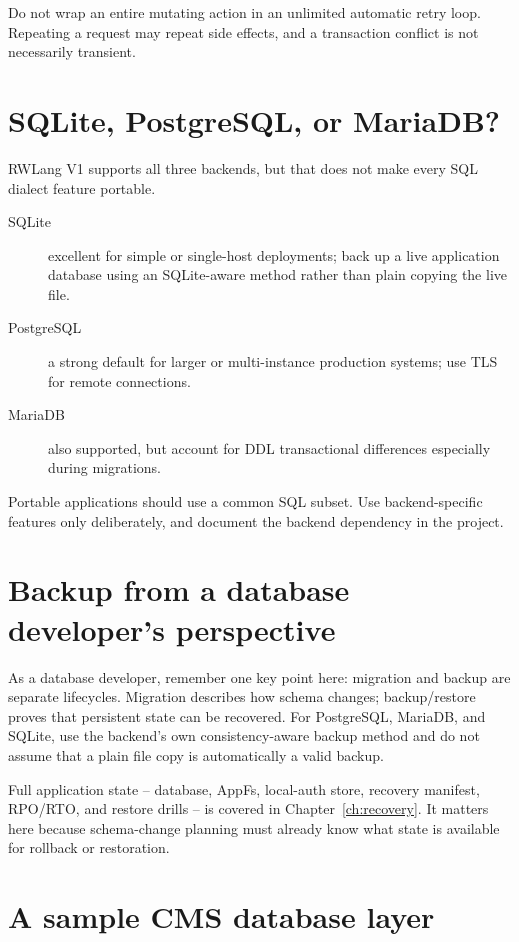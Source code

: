 Do not wrap an entire mutating action in an unlimited automatic retry loop. Repeating a request may repeat side effects, and a transaction conflict is not necessarily transient.

\section{SQLite, PostgreSQL, or MariaDB?}

RWLang V1 supports all three backends, but that does not make every SQL dialect feature portable.

\begin{description}
\item[SQLite] excellent for simple or single-host deployments; back up a live application database using an SQLite-aware method rather than plain copying the live file.
\item[PostgreSQL] a strong default for larger or multi-instance production systems; use TLS for remote connections.
\item[MariaDB] also supported, but account for DDL transactional differences especially during migrations.
\end{description}

Portable applications should use a common SQL subset. Use backend-specific features only deliberately, and document the backend dependency in the project.

\section{Backup from a database developer's perspective}

As a database developer, remember one key point here: migration and backup are separate lifecycles. Migration describes how schema changes; backup/restore proves that persistent state can be recovered. For PostgreSQL, MariaDB, and SQLite, use the backend's own consistency-aware backup method and do not assume that a plain file copy is automatically a valid backup.

Full application state -- database, AppFs, local-auth store, recovery manifest, RPO/RTO, and restore drills -- is covered in Chapter~\ref{ch:recovery}. It matters here because schema-change planning must already know what state is available for rollback or restoration.

\section{A sample CMS database layer}

